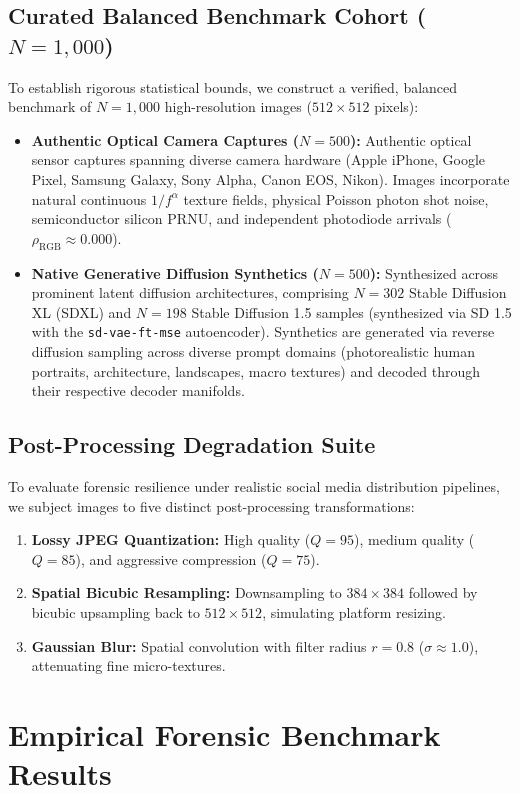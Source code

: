 \documentclass{article}
\theoremstyle{definition}
\begin{document}
\subsection{Curated Balanced Benchmark Cohort ($N=1,000$)}
To establish rigorous statistical bounds, we construct a verified, balanced benchmark of $N=1,000$ high-resolution images ($512 \times 512$ pixels):
\begin{itemize}
    \item \textbf{Authentic Optical Camera Captures ($N=500$):} Authentic optical sensor captures spanning diverse camera hardware (Apple iPhone, Google Pixel, Samsung Galaxy, Sony Alpha, Canon EOS, Nikon). Images incorporate natural continuous $1/f^\alpha$ texture fields, physical Poisson photon shot noise, semiconductor silicon PRNU, and independent photodiode arrivals ($\rho_{\text{RGB}} \approx 0.000$).
    \item \textbf{Native Generative Diffusion Synthetics ($N=500$):} Synthesized across prominent latent diffusion architectures, comprising $N=302$ Stable Diffusion XL (SDXL) and $N=198$ Stable Diffusion 1.5 samples (synthesized via SD 1.5 with the \texttt{sd-vae-ft-mse} autoencoder). Synthetics are generated via reverse diffusion sampling across diverse prompt domains (photorealistic human portraits, architecture, landscapes, macro textures) and decoded through their respective decoder manifolds.
\end{itemize}

\subsection{Post-Processing Degradation Suite}
To evaluate forensic resilience under realistic social media distribution pipelines, we subject images to five distinct post-processing transformations:
\begin{enumerate}
    \item \textbf{Lossy JPEG Quantization:} High quality ($Q=95$), medium quality ($Q=85$), and aggressive compression ($Q=75$).
    \item \textbf{Spatial Bicubic Resampling:} Downsampling to $384 \times 384$ followed by bicubic upsampling back to $512 \times 512$, simulating platform resizing.
    \item \textbf{Gaussian Blur:} Spatial convolution with filter radius $r = 0.8$ ($\sigma \approx 1.0$), attenuating fine micro-textures.
\end{enumerate}

\section{Empirical Forensic Benchmark Results}
\label{sec:results}
\end{document}
